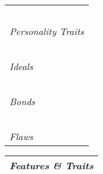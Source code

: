 \documentclass{article}
\begin{document}
 \begin{minipage}{.3\textwidth}
   \begin{tabular}{|m{\textwidth}|}
     \hline
     \\\\\\\\\\
     \textit{\footnotesize{Personality Traits}}\\
     \hline
     \\\\\\\\\\
     \textit{\footnotesize{Ideals}}\\
     \hline
     \\\\\\\\\\
     \textit{\footnotesize{Bonds}}\\
     \hline
     \\\\\\\\\\
     \textit{\footnotesize{Flaws}}\\
     \hline
   \end{tabular}

   \begin{tabular}{|m{\textwidth}|}
     \hline
     \vspace{28em}
     \textit{\footnotesize{Features \& Traits}}\\
     \hline
   \end{tabular}
 \end{minipage}

\newpage
\end{document}
